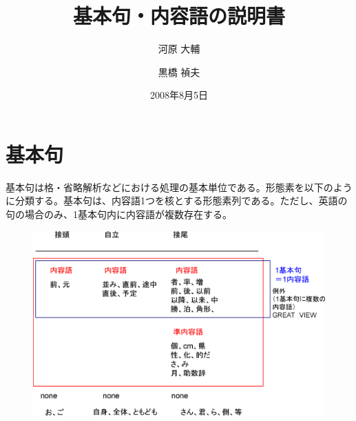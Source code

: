 \documentclass[a4j]{jarticle}
\title{基本句・内容語の説明書}
\author{河原 大輔 \and 黒橋 禎夫}
\date{2008年8月5日}
\newcommand{\sm}[1]{\textless #1\textgreater}
\begin{document}
\maketitle

\section{基本句}

基本句は格・省略解析などにおける処理の基本単位である。形態素を以下のよう
に分類する。基本句は、内容語1つを核とする形態素列である。ただし、英語の
句の場合のみ、1基本句内に内容語が複数存在する。


\begin{figure}[h]
 \begin{center}
  \includegraphics[scale=0.50]{bp.eps}
 \end{center}
\end{figure}

\end{document}
